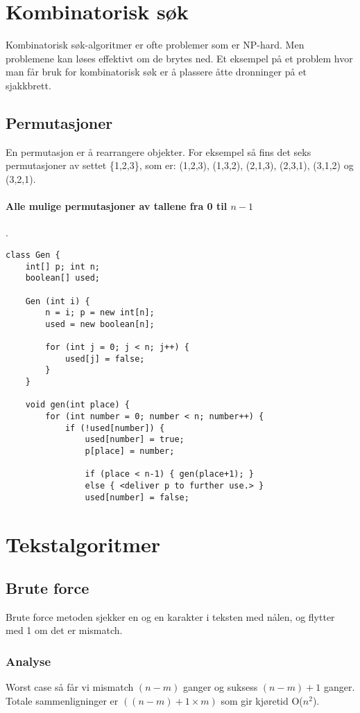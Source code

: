 \documentclass[11pt,a4paper]{article}
\theoremstyle{def}
\begin{document}
\section{Kombinatorisk søk}
Kombinatorisk søk-algoritmer er ofte problemer som er NP-hard. Men problemene kan løses effektivt om de brytes ned. Et eksempel på et problem hvor man får bruk for kombinatorisk søk er å plassere åtte dronninger på et sjakkbrett. 
\vspace{-10pt}
\subsection{Permutasjoner}

En permutasjon er å rearrangere objekter. For eksempel så fins det seks permutasjoner av settet \{1,2,3\}, som er: (1,2,3), (1,3,2), (2,1,3), (2,3,1), (3,1,2) og (3,2,1).
\vspace{-20pt}
\paragraph{Alle mulige permutasjoner av tallene fra 0 til $n-1$}.
\begin{lstlisting}[frame=none]
class Gen {
	int[] p; int n;
	boolean[] used;
	
	Gen (int i) {
		n = i; p = new int[n];
		used = new boolean[n];
	
		for (int j = 0; j < n; j++) {
			used[j] = false;
		}
	}

	void gen(int place) {
		for (int number = 0; number < n; number++) {
			if (!used[number]) {
				used[number] = true;
				p[place] = number;
				
				if (place < n-1) { gen(place+1); }
				else { <deliver p to further use.> }
				used[number] = false;
\end{lstlisting}
\vspace{-30pt}
\section{Tekstalgoritmer}

\subsection{Brute force}
Brute force metoden sjekker en og en karakter i teksten med nålen, og flytter med 1 om det er mismatch.

\subsubsection{Analyse}
Worst case så får vi mismatch $(n-m)$ ganger og suksess $(n-m)+1$ ganger. Totale sammenligninger er $((n-m)+1 \times m)$ som gir kjøretid O($n^2$).
\end{document}
